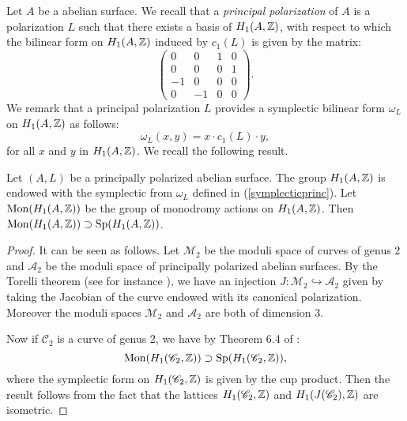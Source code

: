 Let $A$ be a abelian surface. We recall that a \emph{principal polarization} of $A$ is a polarization $L$ such that there exists a basis of $H_1(A,\mathbb{Z})$, with respect to which the bilinear form on $H_1(A,\mathbb{Z})$ induced by $c_1(L)$ is given by the matrix:
$$\left( {\begin{array}{cccc}
   0 & 0 & 1 & 0 \\    0 &  0 & 0 & 1\\ -1 & 0 & 0 & 0\\ 0 & -1 & 0 & 0     
   \end{array} } \right).$$
We remark that a principal polarization $L$ provides a symplectic bilinear form $\omega_L$ on $H_1(A,\mathbb{Z})$ as follows:
\begin{equation}
\omega_L(x,y)=x\cdot c_1(L)\cdot y,
\label{symplecticprinc}
\end{equation}
for all $x$ and $y$ in $H_1(A,\mathbb{Z})$.
We recall the following result. 
\begin{prop}
Let $(A,L)$ be a principally polarized abelian surface. The group $H_1(A,\mathbb{Z})$ is endowed with the symplectic from $\omega_L$ defined in (\ref{symplecticprinc}). Let $\operatorname{Mon} (H_1(A,\mathbb{Z}))$ be the group of monodromy actions on $H_1(A,\mathbb{Z})$.
Then $\operatorname{Mon} (H_1(A,\mathbb{Z}))\supset\operatorname{Sp}(H_1(A,\mathbb{Z}))$.
\end{prop}
\begin{proof}
It can be seen as follows.
Let $\mathcal{M}_2$ be the moduli space of curves of genus $2$ and $\mathcal{A}_2$ be the moduli space of principally polarized abelian surfaces.
By the Torelli theorem (see for instance \cite[Theorem 12.1]{Milne}), we have an injection $J:\mathcal{M}_2\hookrightarrow \mathcal{A}_2$ given by taking the Jacobian of the curve endowed with its canonical polarization. Moreover the moduli spaces $\mathcal{M}_2$ and $\mathcal{A}_2$ are both of dimension 3. 

Now if $\mathscr{C}_2$ is a curve of genus 2, we have by Theorem 6.4 of \cite{Farb}: 
$$\operatorname{Mon} (H_1(\mathscr{C}_2,\mathbb{Z}))\supset \operatorname{Sp}(H_1(\mathscr{C}_2,\mathbb{Z})),$$
where the symplectic form on $H_1(\mathscr{C}_2,\mathbb{Z})$ is given by the cup product. 
Then the result follows from the fact that the lattices $H_1(\mathscr{C}_2,\mathbb{Z})$ and $H_1(J(\mathscr{C}_2),\mathbb{Z})$ are isometric.
\end{proof}
